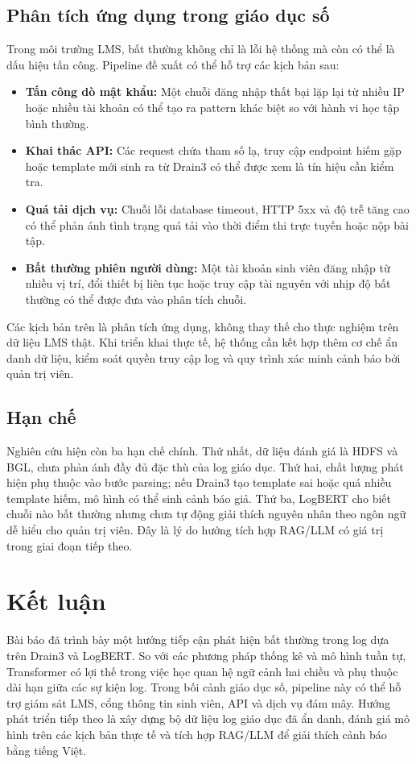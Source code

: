 \documentclass[conference]{IEEEtran}
\begin{document}
\subsection{Phân tích ứng dụng trong giáo dục số}
Trong môi trường LMS, bất thường không chỉ là lỗi hệ thống mà còn có thể là dấu hiệu tấn công. Pipeline đề xuất có thể hỗ trợ các kịch bản sau:
\begin{itemize}
    \item \textbf{Tấn công dò mật khẩu:} Một chuỗi đăng nhập thất bại lặp lại từ nhiều IP hoặc nhiều tài khoản có thể tạo ra pattern khác biệt so với hành vi học tập bình thường.
    \item \textbf{Khai thác API:} Các request chứa tham số lạ, truy cập endpoint hiếm gặp hoặc template mới sinh ra từ Drain3 có thể được xem là tín hiệu cần kiểm tra.
    \item \textbf{Quá tải dịch vụ:} Chuỗi lỗi database timeout, HTTP 5xx và độ trễ tăng cao có thể phản ánh tình trạng quá tải vào thời điểm thi trực tuyến hoặc nộp bài tập.
    \item \textbf{Bất thường phiên người dùng:} Một tài khoản sinh viên đăng nhập từ nhiều vị trí, đổi thiết bị liên tục hoặc truy cập tài nguyên với nhịp độ bất thường có thể được đưa vào phân tích chuỗi.
\end{itemize}

Các kịch bản trên là phân tích ứng dụng, không thay thế cho thực nghiệm trên dữ liệu LMS thật. Khi triển khai thực tế, hệ thống cần kết hợp thêm cơ chế ẩn danh dữ liệu, kiểm soát quyền truy cập log và quy trình xác minh cảnh báo bởi quản trị viên.

\subsection{Hạn chế}
Nghiên cứu hiện còn ba hạn chế chính. Thứ nhất, dữ liệu đánh giá là HDFS và BGL, chưa phản ánh đầy đủ đặc thù của log giáo dục. Thứ hai, chất lượng phát hiện phụ thuộc vào bước parsing; nếu Drain3 tạo template sai hoặc quá nhiều template hiếm, mô hình có thể sinh cảnh báo giả. Thứ ba, LogBERT cho biết chuỗi nào bất thường nhưng chưa tự động giải thích nguyên nhân theo ngôn ngữ dễ hiểu cho quản trị viên. Đây là lý do hướng tích hợp RAG/LLM có giá trị trong giai đoạn tiếp theo.

\section{Kết luận}
Bài báo đã trình bày một hướng tiếp cận phát hiện bất thường trong log dựa trên Drain3 và LogBERT. So với các phương pháp thống kê và mô hình tuần tự, Transformer có lợi thế trong việc học quan hệ ngữ cảnh hai chiều và phụ thuộc dài hạn giữa các sự kiện log. Trong bối cảnh giáo dục số, pipeline này có thể hỗ trợ giám sát LMS, cổng thông tin sinh viên, API và dịch vụ đám mây. Hướng phát triển tiếp theo là xây dựng bộ dữ liệu log giáo dục đã ẩn danh, đánh giá mô hình trên các kịch bản thực tế và tích hợp RAG/LLM để giải thích cảnh báo bằng tiếng Việt.
\end{document}
